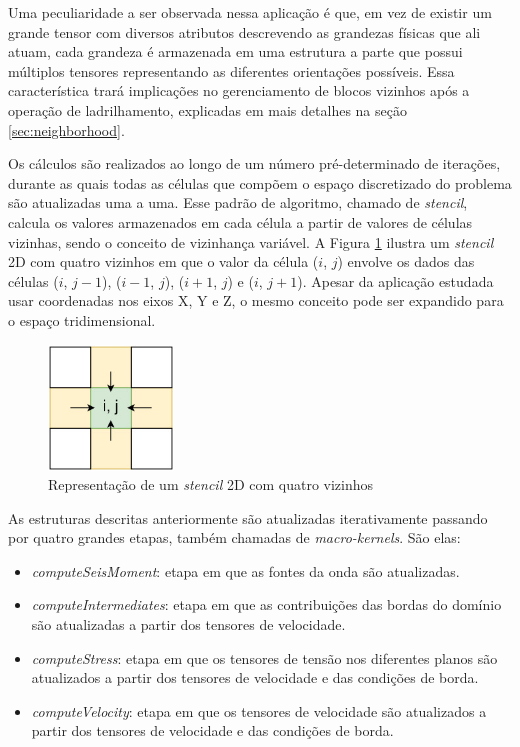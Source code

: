 \documentclass[cic,tc]{iiufrgs}
\begin{document}
Uma peculiaridade a ser observada nessa aplicação é que, em vez de existir um grande tensor com diversos atributos descrevendo as grandezas físicas que ali atuam, cada grandeza
é armazenada em uma estrutura a parte que possui múltiplos tensores representando as diferentes orientações possíveis. Essa característica trará implicações no gerenciamento de blocos
vizinhos após a operação de ladrilhamento, explicadas em mais detalhes na seção \ref{sec:neighborhood}.

Os cálculos são realizados ao longo de um número pré-determinado de iterações, durante as quais todas as células que compõem o espaço discretizado do problema são atualizadas uma a uma. Esse
padrão de algoritmo, chamado de \textit{stencil}, calcula os valores armazenados em cada célula a partir de valores de células vizinhas, sendo o conceito de vizinhança variável. A Figura
\ref{fig:stencil} ilustra um \textit{stencil} 2D com quatro vizinhos em que o valor da célula ($i$, $j$) envolve os dados das células ($i$, $j-1$), ($i-1$, $j$), ($i+1$, $j$) e ($i$, $j+1$).
Apesar da aplicação estudada usar coordenadas nos eixos X, Y e Z, o mesmo conceito pode ser expandido para o espaço tridimensional.

\begin{figure}[!htb]
    \caption{Representação de um \textit{stencil} 2D com quatro vizinhos}
    \begin{center}
      \includegraphics[width=9em]{stencil}
    \end{center}
    \label{fig:stencil}
\end{figure}

As estruturas descritas anteriormente são atualizadas iterativamente passando por quatro grandes etapas, também chamadas de \textit{macro-kernels}. São elas:

\begin{itemize}
\item{\textit{computeSeisMoment}:} etapa em que as fontes da onda são atualizadas.
\item{\textit{computeIntermediates}:} etapa em que as contribuições das bordas do domínio são atualizadas a partir dos tensores de velocidade.
\item{\textit{computeStress}:} etapa em que os tensores de tensão nos diferentes planos são atualizados a partir dos tensores de velocidade e das condições de borda.
\item{\textit{computeVelocity}:} etapa em que os tensores de velocidade são atualizados a partir dos tensores de velocidade e das condições de borda.
\end{itemize}
\end{document}
